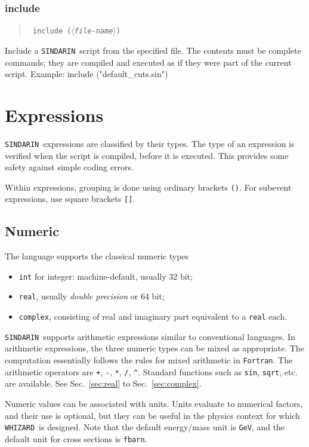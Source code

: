 \documentclass[12pt]{book}
\newenvironment{code}%
  {\begingroup\footnotesize
   \quote
   \Verbatim}%
  {\endVerbatim
   \endquote
   \endgroup\noindent}
\newenvironment{syntax}%
  {\begin{quote}
   \begin{flushleft}\tt}%
  {\end{flushleft}
   \end{quote}}
\newcommand{\var}[1]{$\langle$\textit{#1}$\rangle$}
\newcommand{\ttt}[1]{\texttt{#1}}
\newcommand{\whizard}{\ttt{WHIZARD}}
\newcommand{\sindarin}{\ttt{SINDARIN}}
\newcommand{\fortran}{\ttt{Fortran}}
\begin{document}
\subsubsection{include}
\begin{syntax}
include (\var{file-name})
\end{syntax}
Include a \sindarin\ script from the specified file.  The contents
must be complete commands; they are compiled and executed as if they
were part of the current script.  Example:
\begin{code}
include ("default_cuts.sin")
\end{code}





\section{Expressions}

\sindarin\ expressions are classified by their types.  The
type of an expression is verified when the script is compiled, before
it is executed.  This provides some safety against simple coding
errors.

Within expressions, grouping is done using ordinary brackets \ttt{()}.
For subevent expressions, use square brackets \ttt{[]}.

\subsection{Numeric}
The language supports the classical numeric types
\begin{itemize}
\item
   \ttt{int} for integer: machine-default, usually 32 bit;
\item
   \ttt{real}, usually \emph{double precision} or 64 bit;
\item
   \ttt{complex}, consisting of real and imaginary part equivalent to a
   \ttt{real} each.
\end{itemize}
\sindarin\ supports arithmetic expressions similar to conventional
languages.  In arithmetic expressions, the three numeric types can be
mixed as appropriate.  The computation essentially follows the rules
for mixed arithmetic in \fortran.  The arithmetic operators are
\verb|+|, \verb|-|, \verb|*|, \verb|/|, \verb|^|. Standard functions
such as \ttt{sin}, \ttt{sqrt}, etc. are available.  See
Sec.~\ref{sec:real} to Sec.~\ref{sec:complex}.

Numeric values can be associated with units.  Units evaluate to
numerical factors, and their use is optional, but they can be useful
in the physics context for which \whizard\ is designed.  Note that the
default energy/mass unit is \verb|GeV|, and the default unit for cross
sections is \verb|fbarn|.
\end{document}
